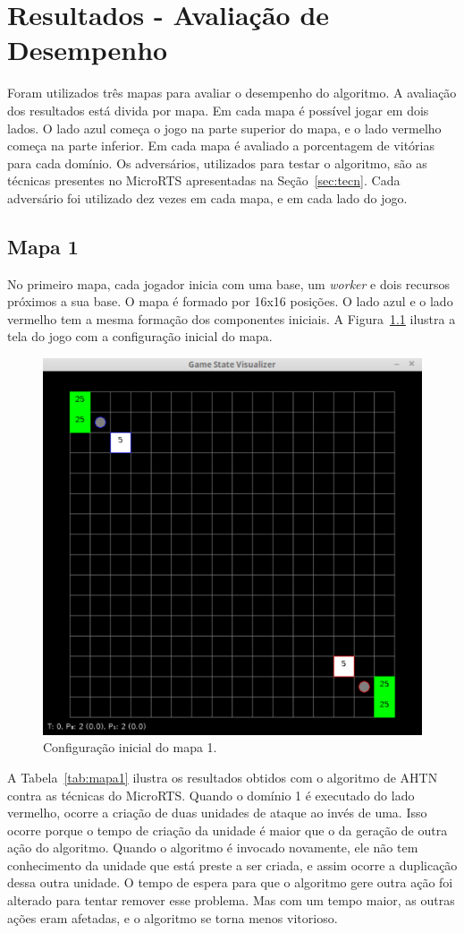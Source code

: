 
\chapter{\label{chap:ativ}Resultados - Avaliação de Desempenho}

Foram utilizados três mapas para avaliar o desempenho do algoritmo.
A avaliação dos resultados está divida por mapa.
Em cada mapa é possível jogar em dois lados.
O lado azul começa o jogo na parte superior do mapa, e o lado vermelho começa na parte inferior.
Em cada mapa é avaliado a porcentagem de vitórias para cada domínio.
Os adversários, utilizados para testar o algoritmo, são as técnicas presentes no MicroRTS apresentadas na Seção~\ref{sec:tecn}.
Cada adversário foi utilizado dez vezes em cada mapa, e em cada lado do jogo.

\section{Mapa 1}

No primeiro mapa, cada jogador inicia com uma base, um \textit{worker} e dois recursos próximos a sua base.
O mapa é formado por 16x16 posições.
O lado azul e o lado vermelho tem a mesma formação dos componentes iniciais.
A Figura~\ref{fig:mapa16x16} ilustra a tela do jogo com a configuração inicial do mapa.

\begin{figure}[ht]
	\centering
	\includegraphics[width=.5\textwidth]{fig/map16x16.pdf}
	\caption{Configuração inicial do mapa 1.}
	\label{fig:mapa16x16}
\end{figure}


A Tabela~\ref{tab:mapa1} ilustra os resultados obtidos com o algoritmo de AHTN contra as técnicas do MicroRTS.
Quando o domínio 1 é executado do lado vermelho, ocorre a criação de duas unidades de ataque ao invés de uma.
Isso ocorre porque o tempo de criação da unidade é maior que o da geração de outra ação do algoritmo.
Quando o algoritmo é invocado novamente, ele não tem conhecimento da unidade que está preste a ser criada, e assim ocorre a duplicação dessa outra unidade.
O tempo de espera para que o algoritmo gere outra ação foi alterado para tentar remover esse problema.
Mas com um tempo maior, as outras ações eram afetadas, e o algoritmo se torna menos vitorioso.

